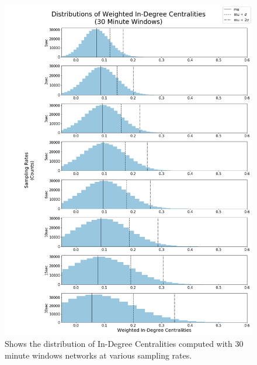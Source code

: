 \begin{figure}[!htb]
  \centerline{\includegraphics[scale=0.42]{figures/PredIF/30MinDist-InDeg.png}}
  \caption{Shows the distribution of In-Degree Centralities computed with 30 minute windows networks at various sampling rates.}
  \label{fig:30MinDist-InDeg}
\end{figure}

